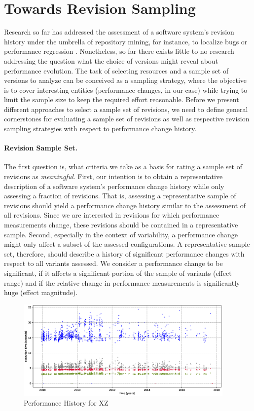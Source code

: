 \section{Towards Revision Sampling}\label{sec:towards_revsampling}
Research so far has addressed the assessment of a software system’s revision
history under the umbrella of repository mining, for instance, to localize bugs
\citep{moin_bug_2010} or performance regression \citep{heger_automated_2013}.
Nonetheless, so far there exists little to no research addressing the question
what the choice of versions might reveal about performance evolution. The task
of selecting resources and a sample set of versions to analyze can be conceived
as a sampling strategy, where the objective is to cover interesting entities
(performance changes, in our case) while trying to limit the sample size to
keep the required effort reasonable. Before we present different approaches to
select a sample set of revisions, we need to define general cornerstones for
evaluating a sample set of revisions as well as respective revision sampling
strategies with respect to performance change history.

\paragraph{Revision Sample Set.} The first question is, what criteria we take as
a basis for rating a sample set of revisions as \emph{meaningful}. First, our intention
is to obtain a representative description of a software system’s performance
change history while only assessing a fraction of revisions. That is, assessing
a representative sample of revisions should yield a performance change history
similar to the assessment of all revisions. Since we are interested in
revisions for which performance measurements change, these revisions should be
contained in a representative sample. Second, especially in the context of
variability, a performance change might only affect a subset of the assessed
configurations. A representative sample set, therefore, should describe a
history of significant performance changes with respect to all variants
assessed. We consider a performance change to be significant, if it affects a
significant portion of the sample of variants (effect range) and if the
relative change in performance measurements is significantly huge (effect
magnitude).

\begin{figure}[h!]
	\centering
	\includegraphics[width=0.95\textwidth]{images/xz_sample_evolution.eps}
	\caption{Performance History for XZ}
	\label{fig:xz_evosample}
\end{figure}

